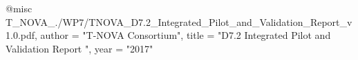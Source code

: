 @misc{ T_NOVA_./WP7/TNOVA_D7.2_Integrated_Pilot_and_Validation_Report_v1.0.pdf,
       author = "{T-NOVA Consortium}",
       title = "D7.2 Integrated Pilot and Validation Report ",
       year = "2017" }
